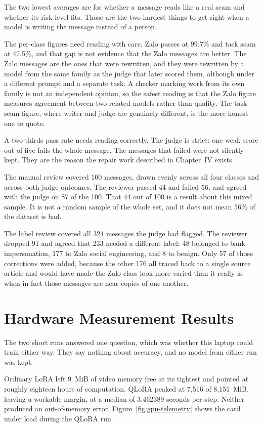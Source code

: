 The two lowest averages are for whether a message reads like a real scam and whether its risk level fits. Those are the two hardest things to get right when a model is writing the message instead of a person.

The per-class figures need reading with care. Zalo passes at 99.7\% and task scam at 47.5\%, and that gap is not evidence that the Zalo messages are better. The Zalo messages are the ones that were rewritten, and they were rewritten by a model from the same family as the judge that later scored them, although under a different prompt and a separate task. A checker marking work from its own family is not an independent opinion, so the safest reading is that the Zalo figure measures agreement between two related models rather than quality. The task-scam figure, where writer and judge are genuinely different, is the more honest one to quote.

A two-thirds pass rate needs reading correctly. The judge is strict: one weak score out of five fails the whole message. The messages that failed were not silently kept. They are the reason the repair work described in Chapter~IV exists.

The manual review covered 100 messages, drawn evenly across all four classes and across both judge outcomes. The reviewer passed 44 and failed 56, and agreed with the judge on 87 of the 100. That 44 out of 100 is a result about this mixed sample. It is not a random sample of the whole set, and it does not mean 56\% of the dataset is bad.

The label review covered all 324 messages the judge had flagged. The reviewer dropped 91 and agreed that 233 needed a different label: 48 belonged to bank impersonation, 177 to Zalo social engineering, and 8 to benign. Only 57 of those corrections were added, because the other 176 all traced back to a single source article and would have made the Zalo class look more varied than it really is, when in fact those messages are near-copies of one another.

\section{Hardware Measurement Results}

The two short runs answered one question, which was whether this laptop could train either way. They say nothing about accuracy, and no model from either run was kept.

Ordinary LoRA left 9~MiB of video memory free at its tightest and pointed at roughly eighteen hours of computation. QLoRA peaked at 7{,}516 of 8{,}151~MiB, leaving a workable margin, at a median of 3.462389 seconds per step. Neither produced an out-of-memory error. Figure~\ref{fig:gpu-telemetry} shows the card under load during the QLoRA run.

